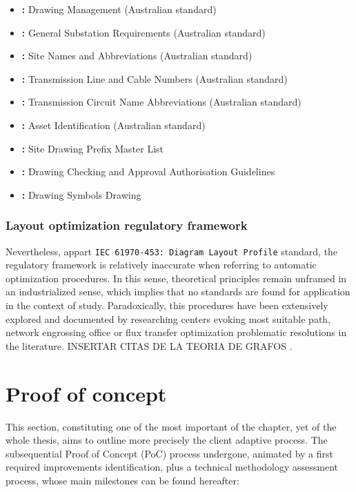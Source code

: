 \begin{itemize}
\begin{itemize}
 \item \textbf{:} Drawing Management (Australian standard)
 \item\textbf{:} General Substation Requirements (Australian standard)
\item\textbf{:} Site Names and Abbreviations (Australian standard)
\item \textbf{:} Transmission Line and Cable Numbers (Australian standard)
\item \textbf{:} Transmission Circuit Name Abbreviations (Australian standard)
\item \textbf{:} Asset Identification (Australian standard)
\item \textbf{:} Site Drawing Prefix Master List
\item \textbf{:} Drawing Checking and Approval Authorisation Guidelines
\item \textbf{:} Drawing Symbols Drawing

    \end{itemize}
\end{itemize}

\subsubsection{Layout optimization regulatory framework}


Nevertheless, appart \texttt{IEC 61970-453: Diagram Layout Profile} standard, the regulatory framework is relatively inaccurate when referring to  automatic optimization procedures. In this sense, theoretical principles remain unframed in an industrialized sense, which implies that no standards are found for  application in the context of study. Paradoxically, this procedures have been extensively explored and documented by researching centers evoking most suitable path, network engrossing office or flux transfer optimization problematic resolutions in the literature. INSERTAR CITAS DE LA TEORIA DE GRAFOS \cite{}.


\section{Proof of concept}

This section, constituting one of the most important of the chapter, yet of the whole thesis, aims to outline more precisely the client adaptive process. The subsequential Proof of Concept (PoC) process undergone, animated by a first required improvements identification, plus a technical methodology assessment process, whose main milestones can be found hereafter:

